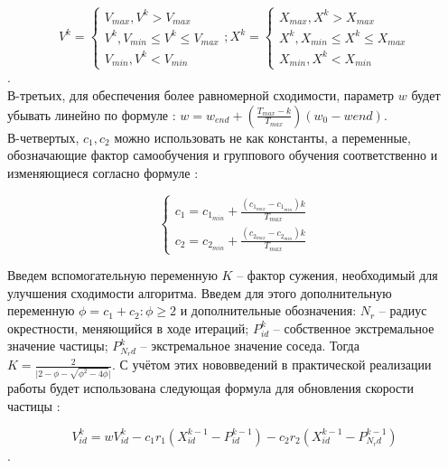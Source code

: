 \begin{equation} \label{advanced_velocity_and_postion_eq}
V^{k} = 
	\begin{cases}
		V_{max}, V^{k} > V_{max} \\
		V^{k}, V_{min} \le V^{k} \le V_{max} \\
		V_{min}, V^{k} < V_{min}
	\end{cases};
X^{k} = 
	\begin{cases}
		X_{max}, X^{k} > X_{max} \\
		X^{k}, X_{min} \le X^{k} \le X_{max} \\
		X_{min}, X^{k} < X_{min}
	\end{cases}
\end{equation}.  \\
В-третьих, для обеспечения более  равномерной сходимости, параметр $w$ будет убывать линейно по формуле \cite[с. 519]{Cheng:2017}: $w = w_{end} + (\frac{T_{max}-k}{T_{max}})(w_0-w{end})$. \\
В-четвертых, $c_1, c_2$ можно использовать не как константы, а переменные, обозначающие фактор самообучения и группового  обучения соответственно и изменяющиеся согласно формуле \cite[с. 519]{Cheng:2017}: 

\begin{equation}
	\begin{cases}
		c_1 = c_{1_{min}} + \frac{(c_{1_{max}} - c_{1_{min}}) k }{T_{max}} \\ 
		c_2 = c_{2_{min}} + \frac{(c_{2_{max}} - c_{2_{min}}) k }{T_{max}}
	\end{cases}
\end{equation}



Введем вспомогательную переменную $K$ -- фактор сужения, необходимый для улучшения сходимости алгоритма. Введем для этого дополнительную переменную $\phi = c_1 + c_2: \phi \ge 2$ и дополнительные обозначения: $N_r$ -- радиус окрестности, меняющийся в ходе итераций; $P_{id}^{k}$ -- собственное экстремальное значение частицы; $P_{N_{r}d}^{k}$ -- экстремальное значение соседа.  Тогда $K = \frac{2}{ \lvert 2 - \phi - \sqrt{\phi ^ 2 - 4 \phi} \rvert}$. С учётом этих нововведений  в практической реализации работы будет использована следующая формула для обновления скорости частицы \cite[с. 520]{Cheng:2017}:

\begin{equation}	\label{best_velocity_and_postion_eq}
	V_{id}^{k} = w V_{id}^{k} - c_1 r_1 (X_{id}^{k-1} - P_{id}^{k-1}) - c_2 r_2 (X_{id}^{k-1} - P_{N_{r}d}^{k-1})
\end{equation}.



